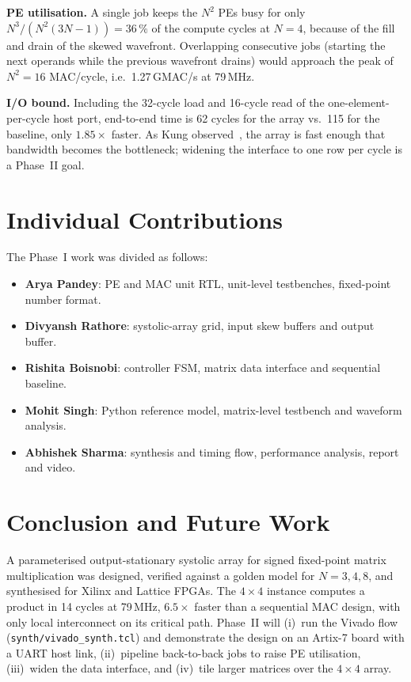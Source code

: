 \documentclass[conference]{IEEEtran}
\newcommand{\memberA}{Arya Pandey}
\newcommand{\memberB}{Divyansh Rathore}
\newcommand{\memberC}{Rishita Boisnobi}
\newcommand{\memberD}{Mohit Singh}
\newcommand{\memberE}{Abhishek Sharma}
\begin{document}
\textbf{PE utilisation.} A single job keeps the $N^2$ PEs busy for only
$N^3/(N^2(3N-1)) = 36\,\%$ of the compute cycles at $N=4$, because of the
fill and drain of the skewed wavefront. Overlapping consecutive jobs (starting
the next operands while the previous wavefront drains) would approach the
peak of $N^2=16$ MAC/cycle, i.e.\ 1.27\,GMAC/s at 79\,MHz.

\textbf{I/O bound.} Including the 32-cycle load and 16-cycle read of the
one-element-per-cycle host port, end-to-end time is 62 cycles for the array
vs.\ 115 for the baseline, only $1.85\times$ faster. As Kung
observed~\cite{kung1982why}, the array is fast enough that bandwidth becomes the
bottleneck; widening the interface to one row per cycle is a Phase~II goal.

\section{Individual Contributions}
The Phase~I work was divided as follows:
\begin{itemize}
\item \textbf{\memberA}: PE and MAC unit RTL, unit-level testbenches, fixed-point number format.
\item \textbf{\memberB}: systolic-array grid, input skew buffers and output buffer.
\item \textbf{\memberC}: controller FSM, matrix data interface and sequential baseline.
\item \textbf{\memberD}: Python reference model, matrix-level testbench and waveform analysis.
\item \textbf{\memberE}: synthesis and timing flow, performance analysis, report and video.
\end{itemize}

\section{Conclusion and Future Work}
A parameterised output-stationary systolic array for signed fixed-point matrix
multiplication was designed, verified against a golden model for $N=3,4,8$, and
synthesised for Xilinx and Lattice FPGAs. The $4\times4$ instance computes a
product in 14 cycles at 79\,MHz, $6.5\times$ faster than a sequential MAC
design, with only local interconnect on its critical path. Phase~II will
(i)~run the Vivado flow (\texttt{synth/vivado\_synth.tcl}) and demonstrate the
design on an Artix-7 board with a UART host link, (ii)~pipeline back-to-back
jobs to raise PE utilisation, (iii)~widen the data interface, and (iv)~tile
larger matrices over the $4\times4$ array.
\end{document}
